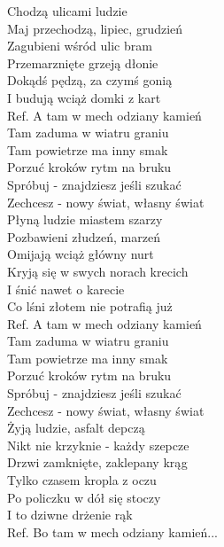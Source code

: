
\begin{flushleft}
Chodzą ulicami ludzie \tab{} \\
Maj przechodzą, lipiec, grudzień \\
Zagubieni wśród ulic bram \tab{}\\
Przemarznięte grzeją dłonie \tab{} \\
Dokądś pędzą, za czymś gonią \tab{}\\
I budują wciąż domki z kart \tab{}\\
\vskip 3mm
Ref. A tam w mech odziany kamień \\
\hspace{0.9cm}Tam zaduma w wiatru graniu  \\
\hspace{0.9cm}Tam powietrze ma inny smak \\
\hspace{0.9cm}Porzuć kroków rytm na bruku \\
\hspace{0.9cm}Spróbuj - znajdziesz jeśli szukać \\
\hspace{0.9cm}Zechcesz - nowy świat, własny świat  \\
\vskip 3mm
Płyną ludzie miastem szarzy \\
Pozbawieni złudzeń, marzeń \\
Omijają wciąż główny nurt \\
Kryją się w swych norach krecich \\
I śnić nawet o karecie \\
Co lśni złotem nie potrafią już \\
\vskip 3mm
Ref. A tam w mech odziany kamień \\
\hspace{0.9cm}Tam zaduma w wiatru graniu \\
\hspace{0.9cm}Tam powietrze ma inny smak \\
\hspace{0.9cm}Porzuć kroków rytm na bruku \\
\hspace{0.9cm}Spróbuj - znajdziesz jeśli szukać \\
\hspace{0.9cm}Zechcesz - nowy świat, własny świat \\
\vskip 3mm
Żyją ludzie, asfalt depczą \\
Nikt nie krzyknie - każdy szepcze \\
Drzwi zamknięte, zaklepany krąg \\
Tylko czasem kropla z oczu \\
Po policzku w dół się stoczy \\
I to dziwne drżenie rąk \\
\vskip 3mm
Ref. Bo tam w mech odziany kamień...
\end{flushleft}
\clearpage